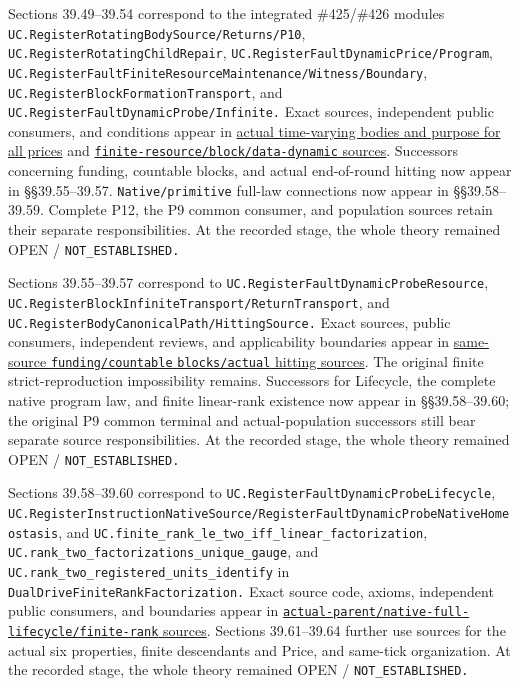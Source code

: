 \documentclass[
  english,
  11pt,
  oneside]{book}
\begin{document}
Sections 39.49--39.54 correspond to the integrated \#425/\#426 modules \nolinkurl{UC.RegisterRotatingBodySource/Returns/P10}, \nolinkurl{UC.RegisterRotatingChildRepair}, \nolinkurl{UC.RegisterFaultDynamicPrice/Program}, \nolinkurl{UC.RegisterFaultFiniteResourceMaintenance/Witness/Boundary}, \nolinkurl{UC.RegisterBlockFormationTransport}, and \nolinkurl{UC.RegisterFaultDynamicProbe/Infinite.} Exact sources, independent public consumers, and conditions appear in \href{../formalization/ueot-core/docs/compression/theory_completion/unified_closure/rotating_body_dynamic_price_source_v1/RESULTS_AND_OPEN_OBLIGATIONS.md}{actual time-varying bodies and purpose for all prices} and \href{../formalization/ueot-core/docs/compression/theory_completion/unified_closure/resource_block_dynamic_data_source_v1/RESULTS_AND_OPEN_OBLIGATIONS.md}{\nolinkurl{finite-resource/block/data-dynamic} sources}. Successors concerning funding, countable blocks, and actual end-of-round hitting now appear in §§39.55--39.57. \nolinkurl{Native/primitive} full-law connections now appear in §§39.58--39.59. Complete P12, the P9 common consumer, and population sources retain their separate responsibilities. At the recorded stage, the whole theory remained OPEN / \nolinkurl{NOT_ESTABLISHED.}

Sections 39.55--39.57 correspond to \nolinkurl{UC.RegisterFaultDynamicProbeResource}, \nolinkurl{UC.RegisterBlockInfiniteTransport/ReturnTransport}, and \nolinkurl{UC.RegisterBodyCanonicalPath/HittingSource.} Exact sources, public consumers, independent reviews, and applicability boundaries appear in \href{../formalization/ueot-core/docs/compression/theory_completion/unified_closure/funded_countable_block_source_v1/RESULTS_AND_OPEN_OBLIGATIONS.md}{same-source \nolinkurl{funding/countable} \nolinkurl{blocks/actual} hitting sources}. The original finite strict-reproduction impossibility remains. Successors for Lifecycle, the complete native program law, and finite linear-rank existence now appear in §§39.58--39.60; the original P9 common terminal and actual-population successors still bear separate source responsibilities. At the recorded stage, the whole theory remained OPEN / \nolinkurl{NOT_ESTABLISHED.}

Sections 39.58--39.60 correspond to \nolinkurl{UC.RegisterFaultDynamicProbeLifecycle}, \nolinkurl{UC.RegisterInstructionNativeSource/RegisterFaultDynamicProbeNativeHomeostasis}, and \nolinkurl{UC.finite_rank_le_two_iff_linear_factorization}, \nolinkurl{UC.rank_two_factorizations_unique_gauge}, and \nolinkurl{UC.rank_two_registered_units_identify} in \nolinkurl{DualDriveFiniteRankFactorization.} Exact source code, axioms, independent public consumers, and boundaries appear in \href{../formalization/ueot-core/docs/compression/theory_completion/unified_closure/native_lifecycle_rank_source_v1/RESULTS_AND_OPEN_OBLIGATIONS.md}{\nolinkurl{actual-parent/native-full-lifecycle/finite-rank} sources}. Sections 39.61--39.64 further use sources for the actual six properties, finite descendants and Price, and same-tick organization. At the recorded stage, the whole theory remained OPEN / \nolinkurl{NOT_ESTABLISHED.}
\end{document}
